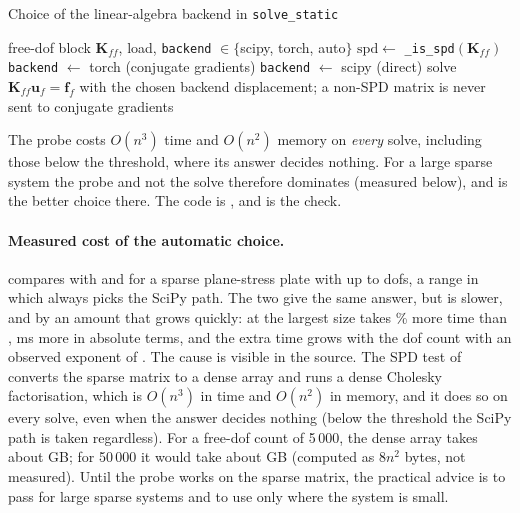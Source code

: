 \begin{algbox}{Choice of the linear-algebra backend in \texttt{solve\_static}}
\begin{pseudo}
\Require free-dof block $\bm K_{ff}$, load, \texttt{backend} $\in\{$scipy, torch, auto$\}$
  \State $\mathrm{spd}\gets$ \texttt{\_is\_spd}$(\bm K_{ff})$ 
    \State \texttt{backend} $\gets$ torch (conjugate gradients)
  \Else
    \State \texttt{backend} $\gets$ scipy (direct)
  \EndIf
\EndIf
\State solve $\bm K_{ff}\bm u_f=\bm f_f$ with the chosen backend
\Ensure displacement; a non-SPD matrix is never sent to conjugate gradients
\end{pseudo}
\end{algbox}

The probe costs $O(n^3)$ time and $O(n^2)$ memory on \emph{every} solve, including those below the threshold, where its answer decides nothing. For a large sparse system the probe and not the solve therefore dominates (measured below), and  is the better choice there. The code is , and  is the check.

\paragraph{Measured cost of the automatic choice.}  compares  with  and  for a sparse plane-stress plate with up to \cdeDispMaxDof{} dofs, a range in which  always picks the SciPy path. The two give the same answer, but  is slower, and by an amount that grows quickly: at the largest size  takes \cdeDispExtraFracLarge{}\% more time than , \cdeDispExtraMs{} ms more in absolute terms, and the extra time grows with the dof count with an observed exponent of \cdeDispSlope{}. The cause is visible in the source. The SPD test of  converts the sparse matrix to a dense array and runs a dense Cholesky factorisation, which is $O(n^3)$ in time and $O(n^2)$ in memory, and it does so on every solve, even when the answer decides nothing (below the threshold the SciPy path is taken regardless). For a free-dof count of 5\,000, the dense array takes about \cdeDenseFiveK{} GB; for 50\,000 it would take about  GB (computed as $8n^2$ bytes, not measured). Until the probe works on the sparse matrix, the practical advice is to pass  for large sparse systems and to use  only where the system is small.

